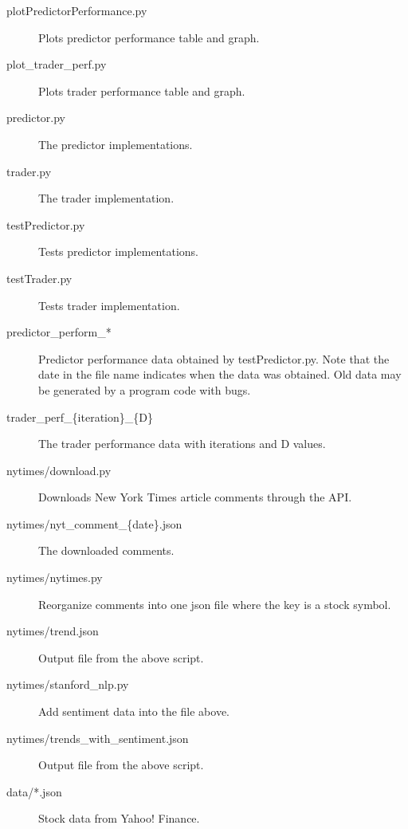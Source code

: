 \documentclass[twocolumn,10pt]{asme2ej}
\begin{document}
\begin{description}
  \item[plotPredictorPerformance.py] Plots predictor performance table and graph.
  \item[plot\_trader\_perf.py] Plots trader performance table and graph.
  \item[predictor.py] The predictor implementations.
  \item[trader.py] The trader implementation.
  \item[testPredictor.py] Tests predictor implementations.
  \item[testTrader.py] Tests trader implementation.
  \item[predictor\_perform\_*] Predictor performance data obtained by
    testPredictor.py. Note that the date in the file name indicates
    when the data was obtained. Old data may be generated by a program
    code with bugs.
    
  \item[trader\_perf\_\{iteration\}\_\{D\}] The trader performance
    data with iterations and D values.
  \item[nytimes/download.py] Downloads New York Times article comments through the API.
  \item[nytimes/nyt\_comment\_\{date\}.json] The downloaded comments.
  \item[nytimes/nytimes.py] Reorganize comments into one json file where the key is a stock symbol.
  \item[nytimes/trend.json] Output file from the above script.
  \item[nytimes/stanford\_nlp.py] Add sentiment data into the file above.
  \item[nytimes/trends\_with\_sentiment.json] Output file from the above script.
  \item[data/*.json] Stock data from Yahoo! Finance.
\end{description}




\end{document}
